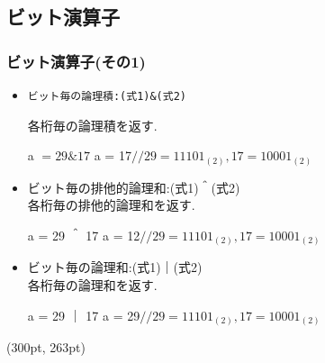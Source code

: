 \documentclass[dvipdfmx]{beamer}
\begin{document}
\subsection{ビット演算子}
\begin{frame}[t, fragile, label=22]
    \frametitle{ビット演算子(その1)}
    \begin{itemize}
        \item \begin{verbatim}ビット毎の論理積:(式1)&(式2)\end{verbatim}
            \qquad 各桁毎の論理積を返す.
            \begin{block}{a $= 29 \& 17$}
                a = 17\qquad $//29=11101_{(2)},17=10001_{(2)}$
            \end{block}
        \item ビット毎の排他的論理和:(式1)＾(式2)\\
            \qquad 各桁毎の排他的論理和を返す.
            \begin{block}{a = 29 ＾ 17}
                a = 12\qquad $//29=11101_{(2)},17=10001_{(2)}$
            \end{block}
        \item ビット毎の論理和:(式1)｜(式2)\\
            \qquad 各桁毎の論理和を返す.
            \begin{block}{a = 29 ｜ 17}
                a = 29\qquad $//29=11101_{(2)},17=10001_{(2)}$
            \end{block}
    \end{itemize}
    \begin{textblock*}{0.3\linewidth}(300pt, 263pt)
    \hyperlink{21}{}
    \space
    \hyperlink{23}{}
    \end{textblock*}
\end{frame}
\end{document}
